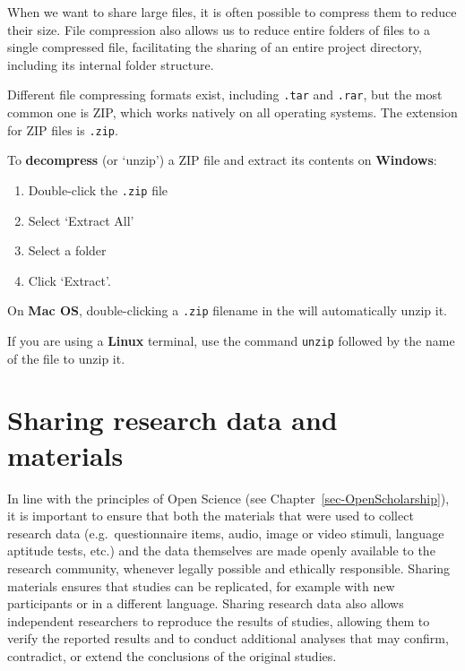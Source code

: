 \documentclass[
  letterpaper,
  DIV=11,
  numbers=noendperiod]{scrreprt}
\providecommand{\tightlist}{%
  \setlength{\itemsep}{0pt}\setlength{\parskip}{0pt}}
\newcounter{quartocalloutnteno}
\newcommand{\quartocalloutnte}[1]{\refstepcounter{quartocalloutnteno}\label{#1}}
\begin{document}
\begin{tcolorbox}[enhanced jigsaw, arc=.35mm, bottomrule=.15mm, bottomtitle=1mm, breakable, colback=white, colbacktitle=quarto-callout-note-color!10!white, colframe=quarto-callout-note-color-frame, coltitle=black, left=2mm, leftrule=.75mm, opacityback=0, opacitybacktitle=0.6, rightrule=.15mm, title=\textcolor{quarto-callout-note-color}{\faInfo}\hspace{0.5em}{Note \ref*{nte-Unzip}: Archiving and compression file formats}, titlerule=0mm, toprule=.15mm, toptitle=1mm]

\quartocalloutnte{nte-Unzip} 

When we want to share large files, it is often possible to compress them
to reduce their size. File compression also allows us to reduce entire
folders of files to a single compressed file, facilitating the sharing
of an entire project directory, including its internal folder structure.

Different file compressing formats exist, including \texttt{.tar} and
\texttt{.rar}, but the most common one is ZIP, which works natively on
all operating systems. The extension for ZIP files is \texttt{.zip}.

To \textbf{decompress} (or `unzip') a ZIP file and extract its contents
on \textbf{Windows}:

\begin{enumerate}
\def\labelenumi{\arabic{enumi}.}
\tightlist
\item
  Double-click the \texttt{.zip} file
\item
  Select `Extract All'
\item
  Select a folder
\item
  Click `Extract'.
\end{enumerate}

On \textbf{Mac OS}, double-clicking a \texttt{.zip} filename in the will
automatically unzip it.

If you are using a \textbf{Linux} terminal, use the command
\texttt{unzip} followed by the name of the file to unzip it.

\end{tcolorbox}

\section{Sharing research data and materials}\label{sec-Sharing}

In line with the principles of Open Science (see
Chapter~\ref{sec-OpenScholarship}), it is important to ensure that both
the materials that were used to collect research data
(e.g.~questionnaire items, audio, image or video stimuli, language
aptitude tests, etc.) and the data themselves are made openly available
to the research community, whenever legally possible and ethically
responsible. Sharing materials ensures that studies can be replicated,
for example with new participants or in a different language. Sharing
research data also allows independent researchers to reproduce the
results of studies, allowing them to verify the reported results and to
conduct additional analyses that may confirm, contradict, or extend the
conclusions of the original studies.
\end{document}
